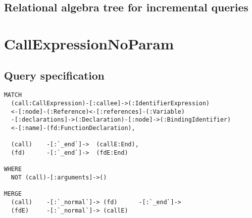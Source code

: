 \subsection*{Relational algebra tree for incremental queries}

\section{CallExpressionNoParam}

\subsection*{Query specification}

\begin{lstlisting}
MATCH
  (call:CallExpression)-[:callee]->(:IdentifierExpression)
  <-[:node]-(:Reference)<-[:references]-(:Variable)
  -[:declarations]->(:Declaration)-[:node]->(:BindingIdentifier)
  <-[:name]-(fd:FunctionDeclaration),

  (call)    -[:`_end`]->  (callE:End),
  (fd)      -[:`_end`]->  (fdE:End)

WHERE
  NOT (call)-[:arguments]->()

MERGE
  (call)    -[:`_normal`]-> (fd)      -[:`_end`]->
  (fdE)     -[:`_normal`]-> (callE)
\end{lstlisting}

